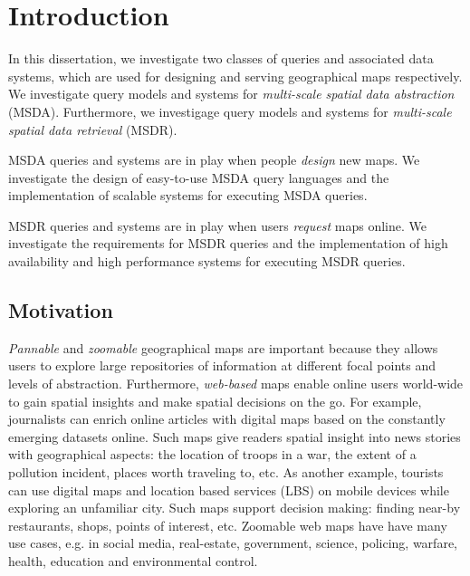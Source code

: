 \chapter{Introduction}

In this dissertation, we investigate two classes of queries and associated data systems, which are used for designing and serving geographical maps respectively. We investigate query models and systems for \emph{multi-scale spatial data abstraction} (MSDA). Furthermore, we investigage query models and systems for \emph{multi-scale spatial data retrieval} (MSDR).

MSDA queries and systems are in play when people \emph{design} new maps. We investigate the design of easy-to-use MSDA query languages and the implementation of scalable systems for executing MSDA queries.

MSDR queries and systems are in play when users \emph{request} maps online. We investigate the requirements for MSDR queries and the implementation of high availability and high performance systems for executing MSDR queries. 


\section{Motivation}
\emph{Pannable} and \emph{zoomable} geographical maps are important because they allows users to explore large repositories of information at different focal points and levels of abstraction. Furthermore, \emph{web-based} maps enable online users world-wide to gain spatial insights and make spatial decisions on the go. For example, journalists can enrich online articles with digital maps based on the constantly emerging datasets online. Such maps give readers spatial insight into news stories with geographical aspects: the location of troops in a war, the extent of a pollution incident, places worth traveling to, etc. As another example, tourists can use digital maps and location based services (LBS) on mobile devices while exploring an unfamiliar city. Such maps support decision making: finding near-by restaurants, shops, points of interest, etc. Zoomable web maps have have many use cases, e.g. in social media, real-estate, government, science, policing, warfare, health, education and environmental control.%

